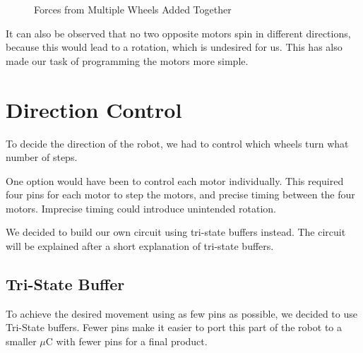 \begin{figure}[htp]
\begin{center}
{    }
	\end{center}
	\vspace{-5mm}
  	\caption{Forces from Multiple Wheels Added Together}
  	\label{fig:forces}
\end{figure}
\newpage
It can also be observed that no two opposite motors spin in different directions,
because this would lead to a rotation, which is undesired for us.
This has also made our task of programming the motors more simple.

\section{Direction Control}\label{sec:direction}
To decide the direction of the robot, we had to control which wheels turn what number of steps. 

One option would have been to control each motor individually.
This required four pins for each motor to step the motors,
and precise timing between the four motors.
Imprecise timing could introduce unintended rotation.

We decided to build our own circuit using tri-state buffers instead.
The circuit will be explained after a short explanation of tri-state buffers.


\subsection{Tri-State Buffer}
To achieve the desired movement using as few pins as possible, we decided to use Tri-State buffers.
Fewer pins make it easier to port this part of the robot to a smaller $\mu$C with fewer pins for a 
final product.

